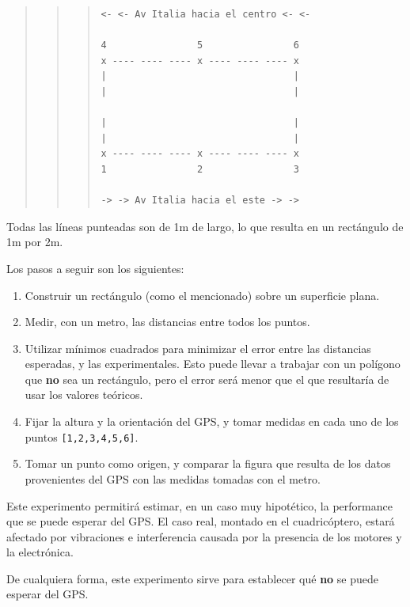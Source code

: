 \documentclass[spanish,12pt,a4paper,titlepage]{report}
\begin{document}
\begin{quote}
\begin{quote}
\begin{quote}
\begin{verbatim}
<- <- Av Italia hacia el centro <- <-

4                5                6
x ---- ---- ---- x ---- ---- ---- x
|                                 |
|                                 |

|                                 |
|                                 |
x ---- ---- ---- x ---- ---- ---- x
1                2                3

-> -> Av Italia hacia el este -> ->
\end{verbatim}
\end{quote}
\end{quote}
\end{quote}

Todas las líneas punteadas son de 1m de largo, lo que resulta en un rectángulo de 1m por 2m.

Los pasos a seguir son los siguientes:

\begin{enumerate}
\item Construir un rectángulo (como el mencionado) sobre un superficie plana.
\item Medir, con un metro, las distancias entre todos los puntos.
\item Utilizar mínimos cuadrados para minimizar el error entre las distancias esperadas, y las experimentales. Esto puede llevar a trabajar con un polígono que \textbf{no} sea un rectángulo, pero el error será menor que el que resultaría de usar los valores teóricos.
\item Fijar la altura y la orientación del GPS, y tomar medidas en cada uno de los puntos \verb+[1,2,3,4,5,6]+.
\item Tomar un punto como origen, y comparar la figura que resulta de los datos provenientes del GPS con las medidas tomadas con el metro.
\end{enumerate}

Este experimento permitirá estimar, en un caso muy hipotético, la performance que se puede esperar del GPS. El caso real, montado en el cuadricóptero, estará afectado por vibraciones e interferencia causada por la presencia de los motores y la electrónica.

De cualquiera forma, este experimento sirve para establecer qué \textbf{no} se puede esperar del GPS.
\end{document}
